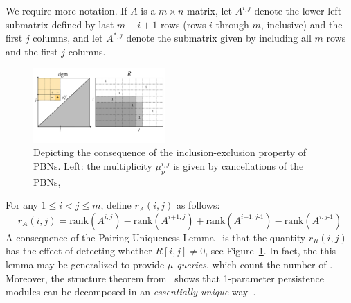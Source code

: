 \documentclass[10pt]{article}
\newcommand{\+}{%
	\raisebox{0.18ex}{\scaleobj{0.55}{+}}
}
\begin{document}
We require more notation. If $A$ is a $m \times n$ matrix,
let $A^{i, j}$ denote the lower-left submatrix defined by last $m - i + 1$ rows (rows $i$ through $m$, inclusive) and the first $j$ columns, and let $A^{\ast, j}$ denote the submatrix given by including all $m$ rows and the first $j$ columns. 
\begin{figure}\label{fig:mult}
\centering
	\includegraphics[width=0.45\textwidth]{pbsig_figs}
	\caption{Depicting the consequence of the inclusion-exclusion property of PBNs. Left: the multiplicity $\mu_p^{i,j}$ is given by cancellations of the PBNs, }
\end{figure}
For any $1 \leq i < j \leq m$, define $r_A(i,j)$ as follows:
\begin{equation}
	r_A(i,j) = \mathrm{rank}(A^{i,j}) - \mathrm{rank}(A^{i\texttt{+}1,j}) + \mathrm{rank}(A^{i\texttt{+}1,j\text{-}1}) - \mathrm{rank}(A^{i,j\text{-}1})
\end{equation}
A consequence of the Pairing Uniqueness Lemma~\cite{} is that the quantity $r_R(i,j)$ has the effect of detecting whether $R[i,j] \neq 0$, see Figure~\ref{fig:mult}. In fact, the this lemma may be generalized to provide \emph{$\mu$-queries}, which count the number of . 
	Moreover, the structure theorem from~\cite{} shows that 1-parameter persistence modules can be decomposed in an \emph{essentially unique} way~\cite{}. 
\end{document}
